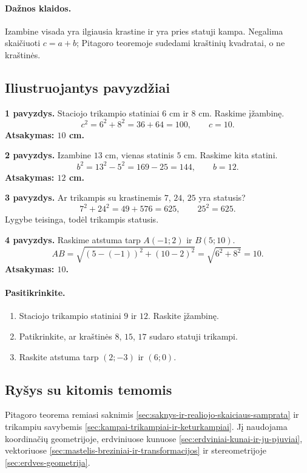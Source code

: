 \paragraph{Dažnos klaidos.}
Izambine visada yra ilgiausia krastine ir yra pries statuji kampa. Negalima skaičiuoti $c=a+b$; Pitagoro teoremoje sudedami kraštinių kvadratai, o ne kraštinės.

\subsection{Iliustruojantys pavyzdžiai}
\textbf{1 pavyzdys.} Staciojo trikampio statiniai $6$ cm ir $8$ cm. Raskime įžambinę.
\[
c^2=6^2+8^2=36+64=100,\qquad c=10.
\]
\textbf{Atsakymas: $10$ cm.}

\textbf{2 pavyzdys.} Izambine $13$ cm, vienas statinis $5$ cm. Raskime kita statini.
\[
b^2=13^2-5^2=169-25=144,\qquad b=12.
\]
\textbf{Atsakymas: $12$ cm.}

\textbf{3 pavyzdys.} Ar trikampis su krastinemis $7$, $24$, $25$ yra statusis?
\[
7^2+24^2=49+576=625,\qquad 25^2=625.
\]
Lygybe teisinga, todėl trikampis statusis.

\textbf{4 pavyzdys.} Raskime atstuma tarp $A(-1;2)$ ir $B(5;10)$.
\[
AB=\sqrt{(5-(-1))^2+(10-2)^2}=\sqrt{6^2+8^2}=10.
\]
\textbf{Atsakymas: $10$.}

\paragraph{Pasitikrinkite.}
\begin{enumerate}[label=\alph*)]
\item Staciojo trikampio statiniai $9$ ir $12$. Raskite įžambinę.
\item Patikrinkite, ar kraštinės $8$, $15$, $17$ sudaro statuji trikampi.
\item Raskite atstuma tarp $(2;-3)$ ir $(6;0)$.
\end{enumerate}

\subsection{Ryšys su kitomis temomis}
Pitagoro teorema remiasi saknimis \ref{sec:saknys-ir-realiojo-skaiciaus-samprata} ir trikampiu savybemis \ref{sec:kampai-trikampiai-ir-keturkampiai}. Jį naudojama koordinačių geometrijoje, erdviniuose kunuose \ref{sec:erdviniai-kunai-ir-ju-pjuviai}, vektoriuose \ref{sec:mastelis-breziniai-ir-transformacijos} ir stereometrijoje \ref{sec:erdves-geometrija}.

